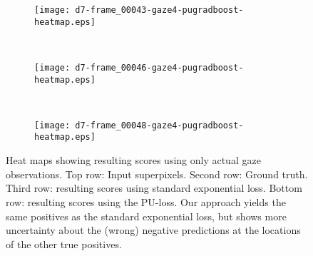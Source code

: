 \begin{figure}[ht]
	\vspace{3mm}
	\begin{subfigure}[h]{0.32\textwidth}
	\texttt{[image: d7-frame\_00043-gaze4-pugradboost-heatmap.eps]}	
	\end{subfigure}
	~
	\begin{subfigure}[h]{0.32\textwidth}
	\texttt{[image: d7-frame\_00046-gaze4-pugradboost-heatmap.eps]}	
	\end{subfigure}
	~	
	\begin{subfigure}[h]{0.32\textwidth}
	\texttt{[image: d7-frame\_00048-gaze4-pugradboost-heatmap.eps]}	
	\end{subfigure}	
	
	\caption{Heat maps showing resulting scores using only actual gaze observations. Top row: Input superpixels. Second row: Ground truth. Third row: resulting scores using standard exponential loss. Bottom row: resulting scores using the PU-loss. Our approach yields the same positives as the standard exponential loss, but shows more uncertainty about the (wrong) negative predictions at the locations of the other true positives.}
	\label{fig:results-d7-gaze4}
\end{figure}

